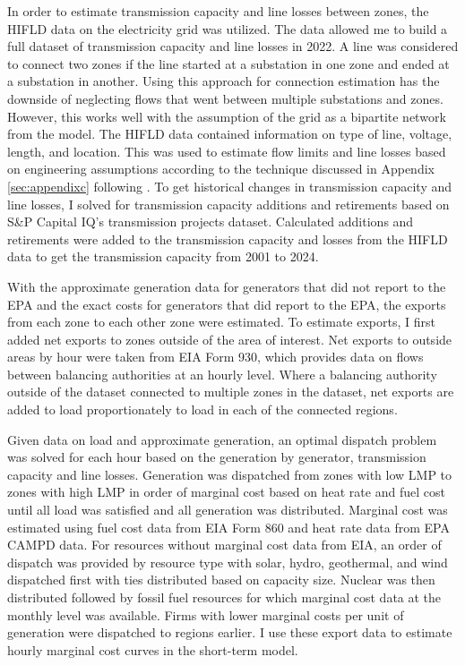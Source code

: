 \documentclass[12pt]{article}
\begin{document}
In order to estimate transmission capacity and line losses between zones, the HIFLD data on the electricity grid was utilized. The data allowed me to build a full dataset of transmission capacity and line losses in 2022. A line was considered to connect two zones if the line started at a substation in one zone and ended at a substation in another. Using this approach for connection estimation has the downside of neglecting flows that went between multiple substations and zones. However, this works well with the assumption of the grid as a bipartite network from the model. The HIFLD data contained information on type of line, voltage, length, and location. This was used to estimate flow limits and line losses based on engineering assumptions according to the technique discussed in Appendix \ref{sec:appendixc} following \cite{arkolakis2023clean}. To get historical changes in transmission capacity and line losses, I solved for transmission capacity additions and retirements based on S\&P Capital IQ's transmission projects dataset. Calculated additions and retirements were added to the transmission capacity and losses from the HIFLD data to get the transmission capacity from 2001 to 2024.

With the approximate generation data for generators that did not report to the EPA and the exact costs for generators that did report to the EPA, the exports from each zone to each other zone were estimated. To estimate exports, I first added net exports to zones outside of the area of interest. Net exports to outside areas by hour were taken from EIA Form 930, which provides data on flows between balancing authorities at an hourly level. Where a balancing authority outside of the dataset connected to multiple zones in the dataset, net exports are added to load proportionately to load in each of the connected regions. 

Given data on load and approximate generation, an optimal dispatch problem was solved for each hour based on the generation by generator, transmission capacity and line losses. Generation was dispatched from zones with low LMP to zones with high LMP in order of marginal cost based on heat rate and fuel cost until all load was satisfied and all generation was distributed. Marginal cost was estimated using fuel cost data from EIA Form 860 and heat rate data from EPA CAMPD data. For resources without marginal cost data from EIA, an order of dispatch was provided by resource type with solar, hydro, geothermal, and wind dispatched first with ties distributed based on capacity size. Nuclear was then distributed followed by fossil fuel resources for which marginal cost data at the monthly level was available. Firms with lower marginal costs per unit of generation were dispatched to regions earlier. I use these export data to estimate hourly marginal cost curves in the short-term model.
\end{document}
